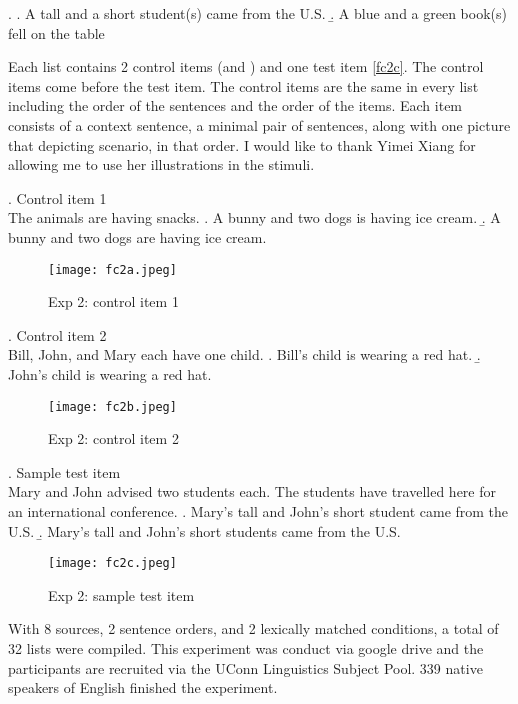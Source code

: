 \documentclass[
  11pt          %
  ,letterpaper  %
  ,center       %
  ,noupper      %
  ]{uconnthesis2}
\begin{document}
\ex. 
\a. A tall and a short student(s) came from the U.S.
\b. A blue and a green book(s) fell on the table

Each list contains 2 control items (\Next and \NNext) and one test item \ref{fc2c}. The control items come before the test item. The control items are the same in every list including the order of the sentences and the order of the items. Each item consists of a context sentence, a minimal pair of sentences, along with one picture that depicting scenario, in that order. I would like to thank Yimei Xiang for allowing me to use her illustrations in the stimuli. 

\ex. Control item 1\\
The animals are having snacks.
\a. A bunny and two dogs is having ice cream.
\b. A bunny and two dogs are having ice cream.
\vspace{-0.5em}
\begin{figure}[htb!] 
\texttt{[image: fc2a.jpeg]} \centering
\caption{Exp 2: control item 1}
\label{fig:exp2a}
\end{figure}\vspace{-1em}

\ex. Control item 2\\
Bill, John, and Mary each have one child.
\a. Bill's child is wearing a red hat.
\b. John's child is wearing a red hat.
\vspace{-0.5em}
\begin{figure}[htb!]
\texttt{[image: fc2b.jpeg]} \centering
\caption{Exp 2: control item 2}
\label{fig:exp2b}
\end{figure}\vspace{-1em}

\ex.\label{fc2c} Sample test item\\
Mary and John advised two students each. The students have travelled here for an international conference.
\a. Mary's tall and John's short student came from the U.S.
\b. Mary's tall and John's short students came from the U.S.
\vspace{-0.5em}
\begin{figure}[htb!]
\texttt{[image: fc2c.jpeg]} \centering
\caption{Exp 2: sample test item}
\label{fig:exp2c}
\end{figure}
\vspace{-1em}

With 8 sources, 2 sentence orders, and 2 lexically matched conditions, a total of 32 lists were compiled. This experiment was conduct via google drive and the participants are recruited via the UConn Linguistics Subject Pool. 339 native speakers of English finished the experiment. 
\end{document}
